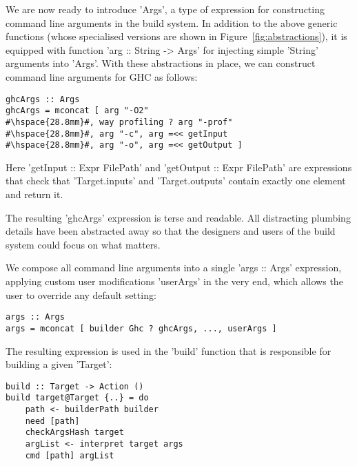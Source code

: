 We are now ready to introduce \lst'Args', a type of expression for
constructing command line arguments in the build system. In addition to the
above generic functions (whose specialised versions are shown in
Figure~\ref{fig:abstractions}), it is equipped with function
\lst'arg :: String -> Args' for injecting simple \lst'String' arguments into
\lst'Args'.  With these abstractions in place, we can construct command
line arguments for GHC as follows:

\begin{lstlisting}
ghcArgs :: Args
ghcArgs = mconcat [ arg "-O2"
#\hspace{28.8mm}#, way profiling ? arg "-prof"
#\hspace{28.8mm}#, arg "-c", arg =<< getInput
#\hspace{28.8mm}#, arg "-o", arg =<< getOutput ]
\end{lstlisting}

\noindent Here \lst'getInput :: Expr FilePath' and
\lst'getOutput :: Expr FilePath' are expressions that check that
\lst'Target.inputs' and \lst'Target.outputs' contain exactly one element and
return it.

The resulting \lst'ghcArgs' expression is terse and readable. All
distracting plumbing details have been abstracted away so that the designers and
users of the build system could focus on what matters. 

We compose all command line arguments into a single \lst'args :: Args' expression,
applying custom user modifications \lst'userArgs' in the very end, which
allows the user to override any default setting:

\begin{lstlisting}
args :: Args
args = mconcat [ builder Ghc ? ghcArgs, ..., userArgs ]
\end{lstlisting}

The resulting expression is used in the \lst'build' function that is responsible
for building a given \lst'Target':

\begin{lstlisting}
build :: Target -> Action ()
build target@Target {..} = do
    path <- builderPath builder
    need [path]
    checkArgsHash target
    argList <- interpret target args
    cmd [path] argList
\end{lstlisting}

